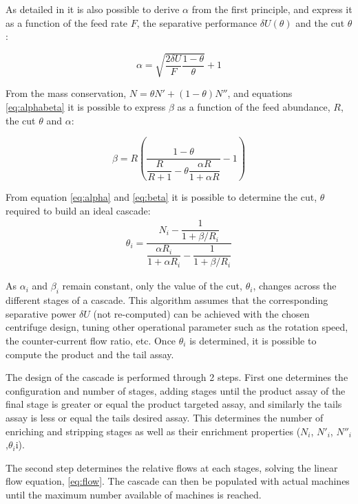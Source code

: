 As detailed in \cite{avery} it is also possible to derive $\alpha$ from the
first principle, and express it as a function of the feed rate $F$, the
separative performance $\delta U(\theta)$ and the cut $\theta$:

    \begin{equation} \label{eq:alpha}
    \alpha = \sqrt{\frac{2\delta U}{F} \frac{1-\theta}{\theta}}+1
\end{equation}

From the mass conservation, $N = \theta N' + (1-\theta)N''$, and equations
\eqref{eq:alphabeta} it is possible to express $\beta$ as a function of the
feed abundance, $R$, the cut $\theta$ and $\alpha$:

\begin{equation}\label{eq:beta}
    \beta =   R \left(\dfrac{1-\theta}
                     {\dfrac{R}{R+1}- \theta \dfrac{\alpha R}{1+\alpha R}} -1\right)
\end{equation}


From equation \eqref{eq:alpha} and \eqref{eq:beta} it is possible to determine
the cut, $\theta$ required to build an ideal cascade:
\begin{eqnarray}
    \theta_{i} = \dfrac{N_{i} - \dfrac{1}{1 + \beta/R_{i}}}{ \dfrac{\alpha R_{i}}{1 + \alpha R_{i}} -
           \dfrac{1}{1 + \beta/R_{i}}}
           \label{eq:theta}
\end{eqnarray}

As $\alpha_{i}$ and $\beta_{i}$ remain constant, only the value of the cut,
$\theta_{i}$, changes across the different stages of a cascade.  This algorithm
assumes that the corresponding separative power $\delta U$ (not re-computed) can
be achieved with the chosen centrifuge design, tuning other operational
parameter such as the rotation speed, the counter-current flow ratio, etc.  Once
$\theta_{i}$ is determined, it is possible to compute the product and the tail
assay.

The design of the cascade is performed through 2 steps.  First one determines
the configuration and number of stages, adding stages until the product assay of
the final stage is greater or equal the product targeted assay, and similarly
the tails assay is less or equal the tails desired assay.  This determines the
number of enriching and stripping stages as well as their enrichment properties
($N_{i}$, $N'_{i}$, $N''_{i}$,$\theta_{i}$i).


The second step determines the relative flows at each stages, solving the linear
flow equation, \eqref{eq:flow}.
The cascade can then be populated with actual machines until the maximum number
available of machines is reached.


